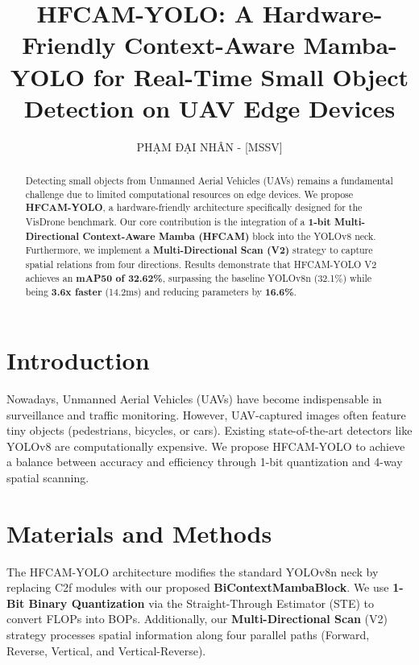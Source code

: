 \documentclass[journal]{IEEEtran}
\begin{document}
\title{HFCAM-YOLO: A Hardware-Friendly Context-Aware Mamba-YOLO for Real-Time Small Object Detection on UAV Edge Devices}
\author{PHẠM ĐẠI NHÂN - [MSSV]}
\maketitle

\begin{abstract} 
Detecting small objects from Unmanned Aerial Vehicles (UAVs) remains a fundamental challenge due to limited computational resources on edge devices. We propose \textbf{HFCAM-YOLO}, a hardware-friendly architecture specifically designed for the VisDrone benchmark. Our core contribution is the integration of a \textbf{1-bit Multi-Directional Context-Aware Mamba (HFCAM)} block into the YOLOv8 neck. Furthermore, we implement a \textbf{Multi-Directional Scan (V2)} strategy to capture spatial relations from four directions. Results demonstrate that HFCAM-YOLO V2 achieves an \textbf{mAP50 of 32.62\%}, surpassing the baseline YOLOv8n (32.1\%) while being \textbf{3.6x faster} (14.2ms) and reducing parameters by \textbf{16.6\%}.
\end{abstract}

\section{Introduction}
Nowadays, Unmanned Aerial Vehicles (UAVs) have become indispensable in surveillance and traffic monitoring. However, UAV-captured images often feature tiny objects (pedestrians, bicycles, or cars). Existing state-of-the-art detectors like YOLOv8 are computationally expensive. We propose HFCAM-YOLO to achieve a balance between accuracy and efficiency through 1-bit quantization and 4-way spatial scanning.

\section{Materials and Methods}
The HFCAM-YOLO architecture modifies the standard YOLOv8n neck by replacing C2f modules with our proposed \textbf{BiContextMambaBlock}. We use \textbf{1-Bit Binary Quantization} via the Straight-Through Estimator (STE) to convert FLOPs into BOPs. Additionally, our \textbf{Multi-Directional Scan} (V2) strategy processes spatial information along four parallel paths (Forward, Reverse, Vertical, and Vertical-Reverse).
\end{document}
